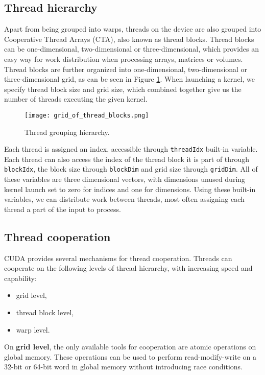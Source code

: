 \subsection{Thread hierarchy}

Apart from being grouped into warps, threads on the device are also grouped into Cooperative Thread Arrays (CTA), also known as thread blocks. Thread blocks can be one-dimensional, two-dimensional or three-dimensional, which provides an easy way for work distribution when processing arrays, matrices or volumes. Thread blocks are further organized into one-dimensional, two-dimensional or three-dimensional grid, as can be seen in Figure \ref{fig:thread_hierarchy}. When launching a kernel, we specify thread block size and grid size, which combined together give us the number of threads executing the given kernel.

\begin{figure}[h]
	\centering
	\texttt{[image: grid\_of\_thread\_blocks.png]}
	\caption{Thread grouping hierarchy.}
	\label{fig:thread_hierarchy}
\end{figure}

Each thread is assigned an index, accessible through \texttt{threadIdx} built-in variable. Each thread can also access the index of the thread block it is part of through \texttt{blockIdx}, the block size through \texttt{blockDim} and grid size through \texttt{gridDim}. All of these variables are three dimensional vectors, with dimensions unused during kernel launch set to zero for indices and one for dimensions. Using these built-in variables, we can distribute work between threads, most often assigning each thread a part of the input to process.

\subsection{Thread cooperation}
\label{sec:thread_cooperation}
CUDA provides several mechanisms for thread cooperation. Threads can cooperate on the following levels of thread hierarchy, with increasing speed and capability:

\begin{itemize}
	\item grid level,
	\item thread block level,
	\item warp level.
\end{itemize}

On \textbf{grid level}, the only available tools for cooperation are atomic operations on global memory. These operations can be used to perform read-modify-write on a 32-bit or 64-bit word in global memory without introducing race conditions.


